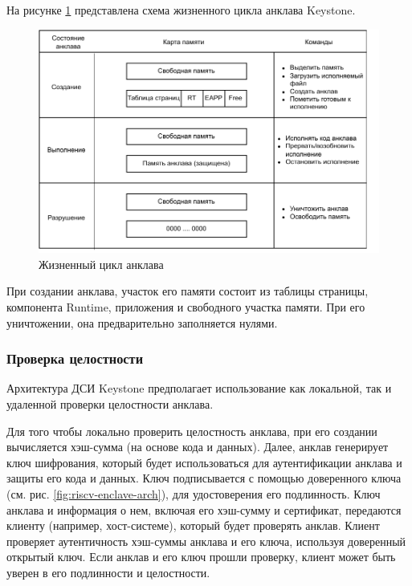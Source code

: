 На рисунке \ref{fig:riscv-enclave-lifecycle} представлена схема жизненного цикла анклава Keystone.

\begin{figure}[h]
	\centering
	\includegraphics[width=\textwidth]{img/riscv-enclave-lifecycle.pdf}
	\caption{Жизненный цикл анклава}
	\label{fig:riscv-enclave-lifecycle}
\end{figure}

При создании анклава, участок его памяти состоит из таблицы страницы, компонента Runtime, приложения и свободного участка памяти. При его уничтожении, она предварительно заполняется нулями.

\subsubsection{Проверка целостности}

Архитектура ДСИ Keystone предполагает использование как локальной, так и удаленной проверки целостности анклава.

Для того чтобы локально проверить целостность анклава, при его создании вычисляется хэш-сумма (на основе кода и данных). Далее, анклав генерирует ключ шифрования, который будет использоваться для аутентификации анклава и защиты его кода и данных. Ключ подписывается с помощью доверенного ключа (см. рис. \ref{fig:riscv-enclave-arch}), для удостоверения его подлинность. Ключ анклава и информация о нем, включая его хэш-сумму и сертификат, передаются клиенту (например, хост-системе), который будет проверять анклав. Клиент проверяет аутентичность хэш-суммы анклава и его ключа, используя доверенный открытый ключ. Если анклав и его ключ прошли проверку, клиент может быть уверен в его подлинности и целостности.

